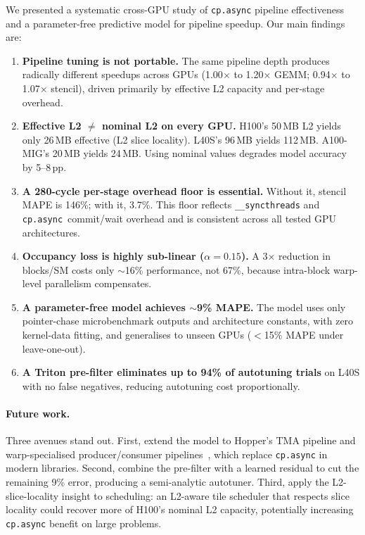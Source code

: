 \documentclass[10pt,twocolumn]{article}
\newcommand{\cpasync}{\texttt{cp.async}}
\begin{document}
We presented a systematic cross-GPU study of \cpasync{} pipeline
effectiveness and a parameter-free predictive model for pipeline
speedup.  Our main findings are:

\begin{enumerate}
\item \textbf{Pipeline tuning is not portable.}  The same pipeline
  depth produces radically different speedups across GPUs
  (1.00$\times$ to 1.20$\times$ GEMM; 0.94$\times$ to 1.07$\times$
  stencil), driven primarily by effective L2 capacity and per-stage
  overhead.
\item \textbf{Effective L2 $\neq$ nominal L2 on every GPU.}
  H100's 50\,MB L2 yields only 26\,MB effective (L2 slice
  locality).  L40S's 96\,MB yields 112\,MB.  A100-MIG's 20\,MB
  yields 24\,MB.  Using nominal values degrades model accuracy by
  5--8\,pp.
\item \textbf{A 280-cycle per-stage overhead floor is essential.}
  Without it, stencil MAPE is 146\%; with it, 3.7\%.  This floor
  reflects \texttt{\_\_syncthreads} and \cpasync{}~commit/wait
  overhead and is consistent across all tested GPU architectures.
\item \textbf{Occupancy loss is highly sub-linear ($\alpha = 0.15$).}
  A 3$\times$ reduction in blocks/SM costs only $\sim$16\%
  performance, not 67\%, because intra-block warp-level parallelism
  compensates.
\item \textbf{A parameter-free model achieves $\sim$9\% MAPE.}
  The model uses only pointer-chase microbenchmark outputs and
  architecture constants, with zero kernel-data fitting, and
  generalises to unseen GPUs ($<$15\% MAPE under leave-one-out).
\item \textbf{A Triton pre-filter eliminates up to 94\% of
  autotuning trials} on L40S with no false negatives, reducing
  autotuning cost proportionally.
\end{enumerate}

\paragraph{Future work.}
Three avenues stand out.  First, extend the model to
Hopper's TMA pipeline and warp-specialised producer/consumer
pipelines~\cite{tawa,twill}, which replace \cpasync{} in modern
libraries.  Second, combine the pre-filter with a learned residual
to cut the remaining 9\% error, producing a semi-analytic
autotuner.  Third, apply the L2-slice-locality insight to
scheduling: an L2-aware tile scheduler that respects slice locality
could recover more of H100's nominal L2 capacity, potentially
increasing \cpasync{} benefit on large problems.
\end{document}
